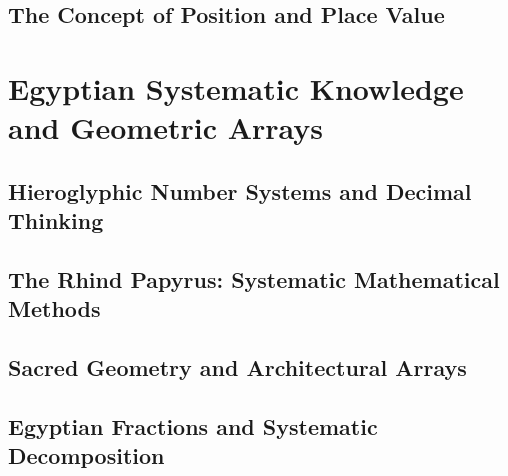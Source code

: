 \documentclass[12pt, oneside, openany]{book}
\begin{document}
\section{The Concept of Position and Place Value}


\chapter{Egyptian Systematic Knowledge and Geometric Arrays}

\section{Hieroglyphic Number Systems and Decimal Thinking}

\section{The Rhind Papyrus: Systematic Mathematical Methods}

\section{Sacred Geometry and Architectural Arrays}

\section{Egyptian Fractions and Systematic Decomposition}

\end{document}
